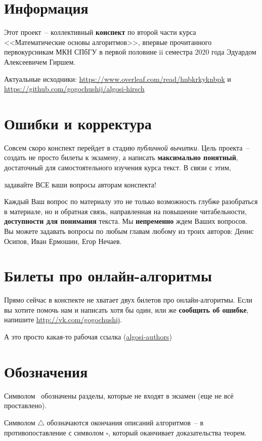 \section*{Информация}

Этот проект~-- коллективный \textbf{конспект} по второй части курса <<Математические основы алгоритмов>>, впервые прочитанного первокурсникам МКН СПбГУ в первой половине ii семестра 2020 года Эдуардом Алексеевичем Гиршем.

Актуальные исходники: \url{https://www.overleaf.com/read/hnbkrkyknbpk} и \url{https://github.com/gogochushij/algosi-hirsch}

\section*{Ошибки и корректура}

Совсем скоро конспект перейдет в стадию \textit{публичной вычитки}. Цель проекта~-- создать не просто билеты к экзамену, а написать \textbf{максимально понятный}, достаточный для самостоятельного изучения курса текст. В связи с этим,

\begin{center} {\color{red} задавайте ВСЕ ваши вопросы авторам конспекта!}\end{center}

Каждый Ваш вопрос по материалу это не только возможность глубже разобраться в материале, но и обратная связь, направленная на повышение читабельности, \textbf{доступности для понимания} текста. Мы \textbf{непременно} ждем Ваших вопросов. Вы можете задавать вопросы по любым главам любому из троих авторов: Денис Осипов, Иван Ермошин, Егор Нечаев.

\section*{Билеты про онлайн-алгоритмы}

Прямо сейчас в конспекте не хватает двух билетов про онлайн-алгоритмы. Если вы хотите помочь нам и написать хотя бы один, или же \textbf{сообщить об ошибке}, напишите \url{http://vk.com/gogochushij}.

А это просто какая-то рабочая ссылка (\href{https://docs.google.com/spreadsheets/d/17MKhLVzCyYvEKlm6W5Bb-6uUDNyv0QLmdvuh4N6JfXI/edit?usp=sharing}{algosi-authors})

\section*{Обозначения}

Символом \heart~обозначены разделы, которые не входят в экзамен (еще не всё проставлено).

Символом $\bigtriangleup$ обозначаются окончания описаний алгоритмов~-- в противопоставление с символом $\square$, который оканчивает доказательства теорем. 
